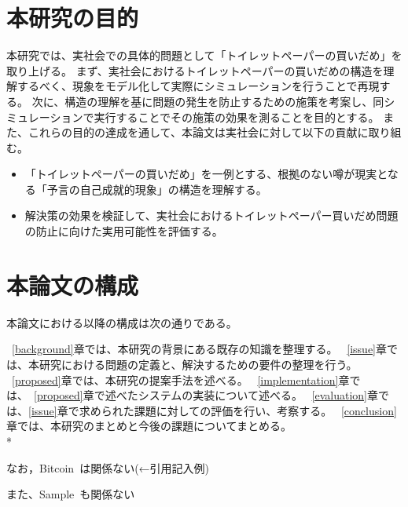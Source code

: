 \section{本研究の目的}

本研究では、実社会での具体的問題として「トイレットペーパーの買いだめ」を取り上げる。
まず、実社会におけるトイレットペーパーの買いだめの構造を理解するべく、現象をモデル化して実際にシミュレーションを行うことで再現する。
次に、構造の理解を基に問題の発生を防止するための施策を考案し、同シミュレーションで実行することでその施策の効果を測ることを目的とする。
また、これらの目的の達成を通して、本論文は実社会に対して以下の貢献に取り組む。

\begin{itemize}
  \item 「トイレットペーパーの買いだめ」を一例とする、根拠のない噂が現実となる「予言の自己成就的現象」の構造を理解する。
  \item 解決策の効果を検証して、実社会におけるトイレットペーパー買いだめ問題の防止に向けた実用可能性を評価する。
\end{itemize}

\section{本論文の構成}

本論文における以降の構成は次の通りである。

~\ref{background}章では、本研究の背景にある既存の知識を整理する。
~\ref{issue}章では、本研究における問題の定義と、解決するための要件の整理を行う。
~\ref{proposed}章では、本研究の提案手法を述べる。
~\ref{implementation}章では、~\ref{proposed}章で述べたシステムの実装について述べる。
~\ref{evaluation}章では、\ref{issue}章で求められた課題に対しての評価を行い、考察する。
~\ref{conclusion}章では、本研究のまとめと今後の課題についてまとめる。\\*


なお，Bitcoin~\cite{Bitcoin}は関係ない(←引用記入例)

また、Sample~\cite{Sample}も関係ない

